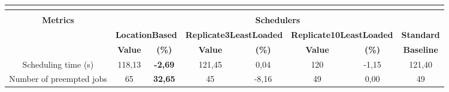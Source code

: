 \begin{table}[]
\begin{tabular}{cccccccc}
\multicolumn{8}{l}{}                                                                                                                                                                                                                                                                                                          \\ \hline
\multicolumn{8}{|c|}{\textbf{}}                                                                                                                                                                                                                                                                                               \\ \hline
\multicolumn{1}{|c|}{\textbf{Metrics}}           & \multicolumn{7}{c|}{\textbf{Schedulers}}                                                                                                                                                                                                                                   \\ \hline
\multicolumn{1}{|c|}{\textbf{}}                  & \multicolumn{2}{c|}{\textbf{LocationBased}}                               & \multicolumn{2}{c|}{\textbf{Replicate3LeastLoaded}}                        & \multicolumn{2}{c|}{\textbf{Replicate10LeastLoaded}}                     & \multicolumn{1}{c|}{\textbf{Standard}} \\ \hline
\multicolumn{1}{|c|}{\textbf{}}                  & \multicolumn{1}{c|}{\textbf{Value}} & \multicolumn{1}{c|}{\textbf{(\%)}}  & \multicolumn{1}{c|}{\textbf{Value}} & \multicolumn{1}{c|}{\textbf{(\%)}}   & \multicolumn{1}{c|}{\textbf{Value}} & \multicolumn{1}{c|}{\textbf{(\%)}} & \multicolumn{1}{c|}{\textbf{Baseline}} \\ \hline
\multicolumn{1}{|c|}{Scheduling time (s)}        & \multicolumn{1}{c|}{118,13}         & \multicolumn{1}{c|}{\textbf{-2,69}} & \multicolumn{1}{c|}{121,45}         & \multicolumn{1}{c|}{0,04}            & \multicolumn{1}{c|}{120}            & \multicolumn{1}{c|}{-1,15}         & \multicolumn{1}{c|}{121,40}            \\ \hline
\multicolumn{1}{|c|}{Number of preempted jobs}   & \multicolumn{1}{c|}{65}             & \multicolumn{1}{c|}{\textbf{32,65}} & \multicolumn{1}{c|}{45}             & \multicolumn{1}{c|}{-8,16}           & \multicolumn{1}{c|}{49}             & \multicolumn{1}{c|}{0,00}          & \multicolumn{1}{c|}{49}                \\ \hline

\end{tabular}
\end{table}
